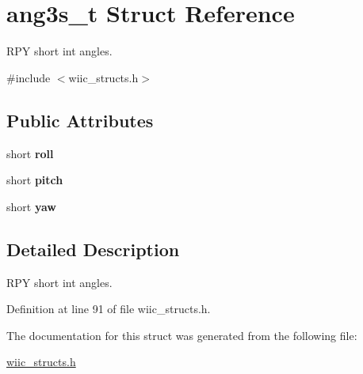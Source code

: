 \hypertarget{structang3s__t}{\section{ang3s\-\_\-t \-Struct \-Reference}
\label{structang3s__t}
}


\-R\-P\-Y short int angles.  




{\ttfamily \#include $<$wiic\-\_\-structs.\-h$>$}

\subsection*{\-Public \-Attributes}
\begin{DoxyCompactItemize}
\item 
\hypertarget{structang3s__t_a1cacb79df7b3e902fe82e4b8be991675}{short {\bfseries roll}}\label{structang3s__t_a1cacb79df7b3e902fe82e4b8be991675}

\item 
\hypertarget{structang3s__t_a1c649065f433716dd2e995394a1bd21d}{short {\bfseries pitch}}\label{structang3s__t_a1c649065f433716dd2e995394a1bd21d}

\item 
\hypertarget{structang3s__t_ac387b50cc3ff1813fa564d086f985dc7}{short {\bfseries yaw}}\label{structang3s__t_ac387b50cc3ff1813fa564d086f985dc7}

\end{DoxyCompactItemize}


\subsection{\-Detailed \-Description}
\-R\-P\-Y short int angles. 

\-Definition at line 91 of file wiic\-\_\-structs.\-h.



\-The documentation for this struct was generated from the following file\-:\begin{DoxyCompactItemize}
\item 
\hyperlink{wiic__structs_8h}{wiic\-\_\-structs.\-h}\end{DoxyCompactItemize}
